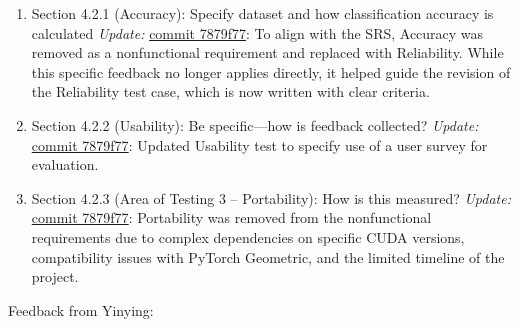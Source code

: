 \documentclass{article}
\begin{document}
\begin{enumerate}
    \item Section 4.2.1 (Accuracy): Specify dataset and how classification accuracy is calculated  
    \newline \textit{Update:} \href{https://github.com/Yuanqi-X/Re-ProtGNN/commit/7879f77}{commit 7879f77}: To align with the SRS, Accuracy was removed as a nonfunctional requirement and replaced with Reliability. While this specific feedback no longer applies directly, it helped guide the revision of the Reliability test case, which is now written with clear criteria.
    

    \item Section 4.2.2 (Usability): Be specific—how is feedback collected?  
    \newline \textit{Update:} \href{https://github.com/Yuanqi-X/Re-ProtGNN/commit/7879f77}{commit 7879f77}: Updated Usability test to specify use of a user survey for evaluation.

    \item Section 4.2.3 (Area of Testing 3 – Portability): How is this measured?  
    \newline \textit{Update:} \href{https://github.com/Yuanqi-X/Re-ProtGNN/commit/7879f772b68f66d5ba42c32c317a3e061d493f88}{commit 7879f77}: Portability was removed from the nonfunctional requirements due to complex dependencies on specific CUDA versions, compatibility issues with PyTorch Geometric, and the limited timeline of the project.

\end{enumerate}

Feedback from Yinying:
\end{document}
